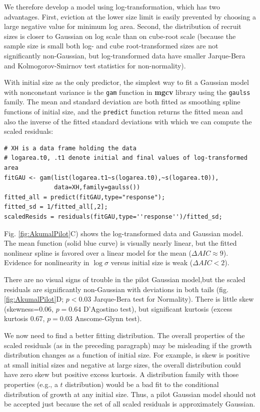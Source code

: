 \documentclass[11pt]{article}
\begin{document}
{We therefore develop a model using log-transformation, which has two advantages. First, eviction at the lower size limit is
easily prevented by choosing a large negative value for minimum log area. Second, the distribution of recruit sizes is closer to Gaussian
on log scale than on cube-root scale (because the sample size is small both log- and cube root-transformed sizes are not significantly
non-Gaussian, but log-transformed data have smaller Jarque-Bera and Kolmogorov-Smirnov test statistics for non-normality). 

With initial size as the only predictor, the simplest way to fit a Gaussian model with nonconstant variance is the
\texttt{gam} function in \textbf{mgcv} library \citep{wood-2017} using the \texttt{gaulss} family. The mean and 
standard deviation are both fitted as smoothing spline functions of initial size, and the \texttt{predict} function
returns the fitted mean and also the inverse of the fitted standard deviations with which we can compute the scaled residuals: 
\begin{lstlisting}
# XH is a data frame holding the data
# logarea.t0, .t1 denote initial and final values of log-transformed area   
fitGAU <- gam(list(logarea.t1~s(logarea.t0),~s(logarea.t0)),
              data=XH,family=gaulss())
fitted_all = predict(fitGAU,type="response"); 
fitted_sd = 1/fitted_all[,2]; 
scaledResids = residuals(fitGAU,type=''response'')/fitted_sd;  
\end{lstlisting}
Fig. \ref{fig:AkumalPilot}C) shows the log-transformed data and Gaussian model. The mean function (solid blue curve) 
is visually nearly linear, but the fitted nonlinear spline is favored over a linear model for the mean ($\Delta AIC \approx 9$). 
Evidence for nonlinearity in $\log \sigma$ versus initial size is weak ($\Delta AIC <2$). 

There are no visual signs of trouble in the pilot Gaussian model,but the scaled residuals are 
significantly non-Gaussian with deviations in both tails (fig. \ref{fig:AkumalPilot}D; $p<0.03$ Jarque-Bera test for Normality).
There is little skew (skewness=0.06, $p=0.64$ D'Agostino test), but significant kurtosis (excess kurtosis 0.67, $p=0.03$ 
Anscome-Glynn test). 

We now need to find a better fitting distribution. The overall properties of the scaled residuals (as in the preceding
paragraph) may be misleading if the growth distribution changes as a function of initial size. 
For example, is skew is positive at small initial sizes and negative at large sizes, the overall distribution 
could have zero skew but positive excess kurtosis. A distribution family with those properties (e.g., a $t$ distribution) 
would be a bad fit to the conditional distribution of growth at any initial size. Thus, a pilot Gaussian model should not
be accepted just because the set of all scaled residuals is approximately Gaussian. 

}
\end{document}
